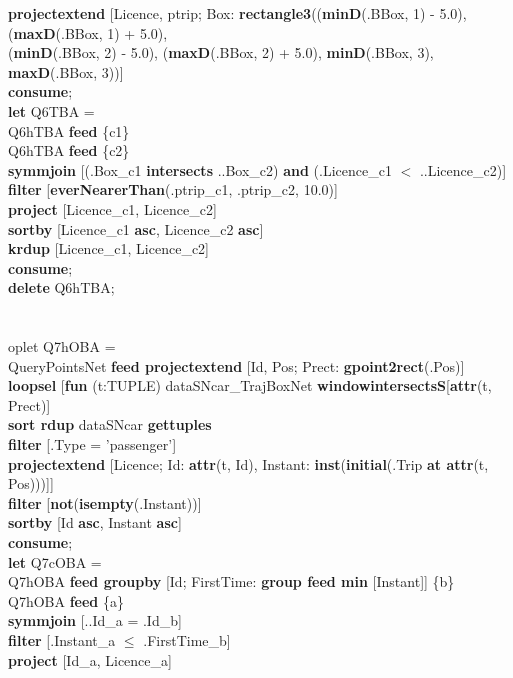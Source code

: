 \documentclass[a4paper]{article}
\newcommand{\op}[1]{\textbf{#1}}
\begin{document}
\begin{scriptsize}
\begin{tabbing}
\>\op{projectextend} [Licence, ptrip; Box: \op{rectangle3}((\op{minD}(.BBox, 1) - 5.0), (\op{maxD}(.BBox, 1) + 5.0),\\
\>\>\>\>(\op{minD}(.BBox, 2) - 5.0), (\op{maxD}(.BBox, 2) + 5.0), \op{minD}(.BBox, 3), \op{maxD}(.BBox, 3))]\\
\op{consume};\\
\op{let} Q6TBA =\\
\>Q6hTBA \op{feed} \{c1\}\\
\>Q6hTBA \op{feed} \{c2\}\\
\>\op{symmjoin} [(.Box\_c1 \op{intersects} ..Box\_c2) \op{and} (.Licence\_c1 $<$ ..Licence\_c2)]\\
\>\op{filter} [\op{everNearerThan}(.ptrip\_c1, .ptrip\_c2, 10.0)]\\
\>\op{project} [Licence\_c1, Licence\_c2]\\
\>\op{sortby} [Licence\_c1 \op{asc}, Licence\_c2 \op{asc}]\\
\>\op{krdup} [Licence\_c1, Licence\_c2]\\
\op{consume};\\
\op{delete} Q6hTBA;\\
\\
\\op{let} Q7hOBA =\\
\>QueryPointsNet \op{feed projectextend} [Id, Pos; Prect: \op{gpoint2rect}(.Pos)]\\
\>\op{loopsel} [\op{fun} (t:TUPLE) dataSNcar\_TrajBoxNet \op{windowintersectsS}[\op{attr}(t, Prect)]\\
\>\>\op{sort rdup} dataSNcar \op{gettuples}\\
\>\>\op{filter} [.Type = 'passenger']\\
\>\>\op{projectextend} [Licence; Id: \op{attr}(t, Id), Instant: \op{inst}(\op{initial}(.Trip \op{at attr}(t, Pos)))]]\\
\>\op{filter} [\op{not}(\op{isempty}(.Instant))]\\
\>\op{sortby} [Id \op{asc}, Instant \op{asc}]\\
\op{consume};\\
\op{let} Q7cOBA =\\
\>Q7hOBA \op{feed groupby} [Id; FirstTime: \op{group feed min} [Instant]] \{b\}\\
\>Q7hOBA \op{feed} \{a\}\\
\>\op{symmjoin} [..Id\_a = .Id\_b]\\
\>\op{filter} [.Instant\_a $\leq$ .FirstTime\_b]\\
\>\op{project} [Id\_a, Licence\_a]\\

\end{tabbing}
\end{scriptsize}
\end{document}
